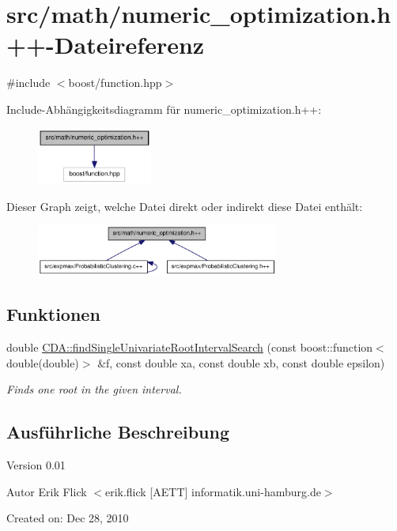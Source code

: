 \hypertarget{numeric__optimization_8h_09_09}{
\section{src/math/numeric\_\-optimization.h++-\/Dateireferenz}
\label{numeric__optimization_8h_09_09}
}
{\ttfamily \#include $<$boost/function.hpp$>$}\par
Include-\/Abhängigkeitsdiagramm für numeric\_\-optimization.h++:\nopagebreak
\begin{figure}[H]
\begin{center}
\leavevmode
\includegraphics[width=107pt]{numeric__optimization_8h_09_09__incl}
\end{center}
\end{figure}
Dieser Graph zeigt, welche Datei direkt oder indirekt diese Datei enthält:\nopagebreak
\begin{figure}[H]
\begin{center}
\leavevmode
\includegraphics[width=226pt]{numeric__optimization_8h_09_09__dep__incl}
\end{center}
\end{figure}
\subsection*{Funktionen}
\begin{DoxyCompactItemize}
\item 
double \hyperlink{namespaceCDA_ab4d6ad3bb6730a396ee12d33fe5ad7ca}{CDA::findSingleUnivariateRootIntervalSearch} (const boost::function$<$ double(double)$>$ \&f, const double xa, const double xb, const double epsilon)
\begin{DoxyCompactList}\small\item\em Finds one root in the given interval. \item\end{DoxyCompactList}\end{DoxyCompactItemize}


\subsection{Ausführliche Beschreibung}
\begin{DoxyVersion}{Version}
0.01 
\end{DoxyVersion}
\begin{DoxyAuthor}{Autor}
Erik Flick $<$erik.flick \mbox{[}AETT\mbox{]} informatik.uni-\/hamburg.de$>$
\end{DoxyAuthor}
Created on: Dec 28, 2010 